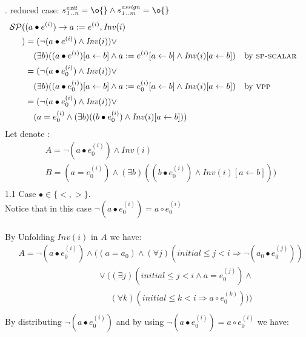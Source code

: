 \documentclass[a4paper,10pt]{article}
\newcommand{\idx}{\ensuremath{i}\xspace}
\newcommand{\idxinitial}{\ensuremath{\mathit{initial}}\xspace}
\newcommand{\at}[1]{{(#1)}}
\newcommand{\impl}{\ensuremath{\Longrightarrow}}
\newcommand{\Inv}[1]{\ensuremath{\mathit{Inv}(#1)\xspace}}
\newcommand{\gstatement}[2]{\ensuremath{s^{\mathit{#1}}_{\mathit{#2}}\xspace}}
\newcommand{\vpp}{\textsc{vpp}\xspace}
\newcommand{\spscalar}{\textsc{sp-scalar}\xspace}
\newenvironment{proof}[1][Proof.]{\begin{trivlist}
\item[\hskip \labelsep {\bfseries #1}]}{\end{trivlist}}
\begin{document}
\begin{proof}
. reduced case: $\gstatement{exit}{1..n} = \o{} \land \gstatement{assign}{1..m} = \o{}$
  \begin{align*}
    \spost{
    &(a \bullet e^\at{\idx}) \rightarrow a := e^\at{\idx}}{\Inv{\idx}\\
    }
    &=(\neg (a \bullet e^\at{\idx}) \land \Inv{\idx}) \lor \\
      & \quad (\exists b) ((a \bullet e^\at{\idx})[a\leftarrow b] \land 
      a := e^\at{\idx}[a\leftarrow b] \land \Inv{\idx}[a\leftarrow b])   && \text{by \spscalar}\\
    &=(\neg (a \bullet e_0^\at{\idx}) \land \Inv{\idx}) \lor \\
      & \quad (\exists b) ((a \bullet e_0^\at{\idx})[a\leftarrow b] \land 
      a := e_0^\at{\idx}[a\leftarrow b] \land \Inv{\idx}[a\leftarrow b])  && \text{by \vpp}\\
    &=(\neg (a \bullet e_0^\at{\idx}) \land \Inv{\idx}) \lor \\
      & \quad (a = e_0^\at{\idx} \land (\exists b) ((b \bullet e_0^\at{\idx}) 
      \land \Inv{\idx}[a\leftarrow b]))  &&\\
  \end{align*}
  Let denote :
  \begin{align*}
    &A=\neg (a \bullet e_0^\at{\idx}) \land \Inv{\idx} \\
    &B=(a = e_0^\at{\idx}) \land (\exists b) ((b \bullet e_0^\at{\idx}) \land \Inv{\idx}[a\leftarrow b])) \\
  \end{align*}
  1.1 Case $\bullet \in \{<, >\}$.\\
  Notice that in this case $\neg (a \bullet e_0^\at{\idx}) = a \circ e_0^\at{\idx}$\\
  \\
  By Unfolding $\Inv{\idx}$ in $A$ we have:
  \begin{align*}
    &A=\neg (a \bullet e_0^\at{\idx}) \land ((a = a_0) \land 
       (\forall j)(\idxinitial \leq j < \idx \impl \neg (a_0 \bullet e_0^\at{j})) \\
    &\phantom{A= \neg (a \bullet e_0^\at{\idx}) \land (}
       \lor ((\exists j)(\idxinitial \leq j < \idx \land a = e_0^\at{j}) \land\\
    &\phantom{A= \neg (a \bullet e_0^\at{\idx}) \land  (( \lor (}
       (\forall k)(\idxinitial \leq k < \idx \impl a \circ e_0^\at{k})))\\
  \end{align*}
  By distributing $\neg (a \bullet e_0^\at{\idx})$ and by using $\neg (a \bullet e_0^\at{\idx}) = a \circ e_0^\at{\idx}$  we have:

\end{proof}
\end{document}

